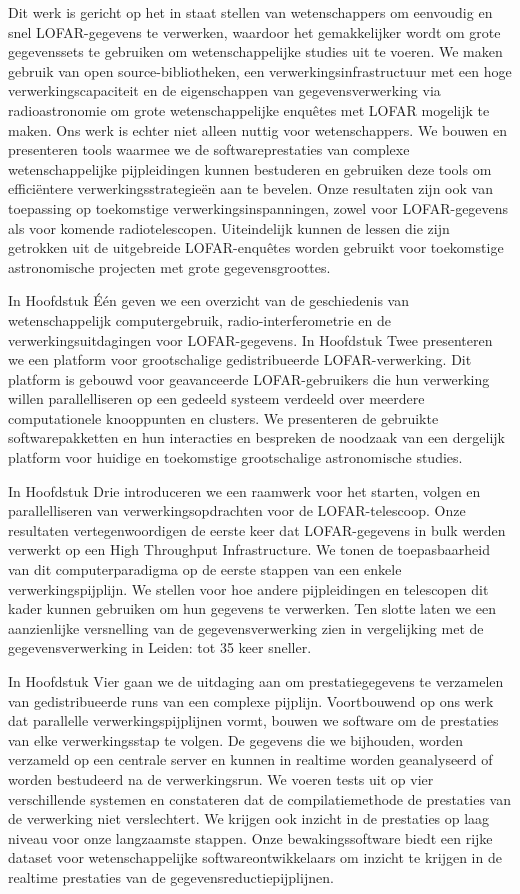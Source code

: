 Dit werk is gericht op het in staat stellen van wetenschappers om eenvoudig en snel LOFAR-gegevens te verwerken, waardoor het gemakkelijker wordt om grote gegevenssets te gebruiken om wetenschappelijke studies uit te voeren. We maken gebruik van open source-bibliotheken, een verwerkingsinfrastructuur met een hoge verwerkingscapaciteit en de eigenschappen van gegevensverwerking via radioastronomie om grote wetenschappelijke enquêtes met LOFAR mogelijk te maken. Ons werk is echter niet alleen nuttig voor wetenschappers. We bouwen en presenteren tools waarmee we de softwareprestaties van complexe wetenschappelijke pijpleidingen kunnen bestuderen en gebruiken deze tools om efficiëntere verwerkingsstrategieën aan te bevelen. Onze resultaten zijn ook van toepassing op toekomstige verwerkingsinspanningen, zowel voor LOFAR-gegevens als voor komende radiotelescopen. Uiteindelijk kunnen de lessen die zijn getrokken uit de uitgebreide LOFAR-enquêtes worden gebruikt voor toekomstige astronomische projecten met grote gegevensgroottes.

In Hoofdstuk Één geven we een overzicht van de geschiedenis van wetenschappelijk computergebruik, radio-interferometrie en de verwerkingsuitdagingen voor LOFAR-gegevens. In Hoofdstuk Twee presenteren we een platform voor grootschalige gedistribueerde LOFAR-verwerking. Dit platform is gebouwd voor geavanceerde LOFAR-gebruikers die hun verwerking willen parallelliseren op een gedeeld systeem verdeeld over meerdere computationele knooppunten en clusters. We presenteren de gebruikte softwarepakketten en hun interacties en bespreken de noodzaak van een dergelijk platform voor huidige en toekomstige grootschalige astronomische studies.

In Hoofdstuk Drie introduceren we een raamwerk voor het starten, volgen en parallelliseren van verwerkingsopdrachten voor de LOFAR-telescoop. Onze resultaten vertegenwoordigen de eerste keer dat LOFAR-gegevens in bulk werden verwerkt op een High Throughput Infrastructure. We tonen de toepasbaarheid van dit computerparadigma op de eerste stappen van een enkele verwerkingspijplijn. We stellen voor hoe andere pijpleidingen en telescopen dit kader kunnen gebruiken om hun gegevens te verwerken. Ten slotte laten we een aanzienlijke versnelling van de gegevensverwerking zien in vergelijking met de gegevensverwerking in Leiden: tot 35 keer sneller.

In Hoofdstuk Vier gaan we de uitdaging aan om prestatiegegevens te verzamelen van gedistribueerde runs van een complexe pijplijn. Voortbouwend op ons werk dat parallelle verwerkingspijplijnen vormt, bouwen we software om de prestaties van elke verwerkingsstap te volgen. De gegevens die we bijhouden, worden verzameld op een centrale server en kunnen in realtime worden geanalyseerd of worden bestudeerd na de verwerkingsrun. We voeren tests uit op vier verschillende systemen en constateren dat de compilatiemethode de prestaties van de verwerking niet verslechtert. We krijgen ook inzicht in de prestaties op laag niveau voor onze langzaamste stappen. Onze bewakingssoftware biedt een rijke dataset voor wetenschappelijke softwareontwikkelaars om inzicht te krijgen in de realtime prestaties van de gegevensreductiepijplijnen.

